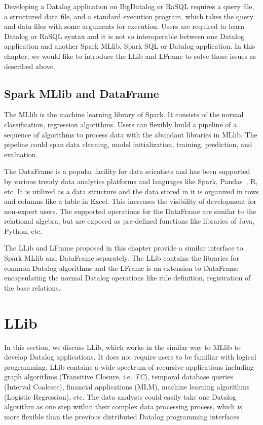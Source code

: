 Developing a Datalog application on BigDatalog or RaSQL  requires a query file, a structured data file, and a standard execution program, which takes the query and data files with some arguments for execution. Users are required to learn Datalog or RaSQL syntax and it is not so interoperable  between one Datalog application and another Spark MLlib, Spark SQL or Datalog application. In this chapter, we would like to  introduce the LLib and LFrame to solve those issues 
as described above.


\subsection{Spark MLlib and DataFrame}

The MLlib is the machine learning library of Spark. It consists of the normal classification, regression algorithms. Users can flexibly build a pipeline of a sequence of algorithms to process data with the abundant libraries in MLlib. The pipeline could span data cleaning, model initialization, training, prediction, and evaluation.  

The DataFrame is a popular facility for data scientists and has been supported by various trendy data analytics platforms and languages like Spark, Pandas~\citep{pythonDataframe}, R, etc. It is utilized as a data structure and the data stored in it is organized in rows and columns like a table in Excel. This increases the visibility of development for non-expert users. The supported operations for the DataFrame are similar to the relational algebra, but are exposed as pre-defined functions like libraries of Java, Python, etc.   

The LLib and LFrame proposed in this chapter provide a similar interface to Spark MLlib and DataFrame separately. The LLib contains the libraries for common Datalog algorithms and the LFrame is an extension to DataFrame encapsulating the normal Datalog operations like rule definition, registration of the base relations. 

\section{LLib}
\label{llib}
In this section, we discuss LLib, which works in the similar way to MLlib to develop Datalog applications. It does not require  users to be familiar with logical programming. LLib contains a wide spectrum of recursive applications including graph algorithms (Transitive Closure, i.e. \textit{TC}), temporal database queries (Interval Coalesce), financial applications (MLM),  machine learning algorithms (Logistic Regression), etc. 
The data analysts could easily take one Datalog algorithm as one step within their complex data processing process, which is more flexible than the previous distributed Datalog programming interfaces. 











